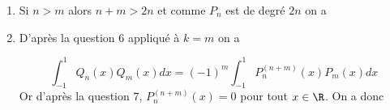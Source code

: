 \documentclass[a4paper, 11pt,reqno]{article}
\begin{document}
\begin{correction}
\begin{enumerate}
\begin{itemize}

\end{itemize}


\item Si $n>m$ alors $n+m >2n$ et comme $P_n$ est de degré $2n$
on a 

\item D'après la question $6$ appliqué à $k=m$ on a 

$$\int_{-1}^{1} Q_n(x) Q_m(x)dx = (-1)^m\int_{-1}^{1} P_n^{(n+m)}(x) P_m (x)dx$$
Or d'après la question $7$, $P_n^{(n+m)}(x)=0$ pour tout $x\in \R$. 
On a donc 


\end{enumerate}
\end{correction}
\end{document}
